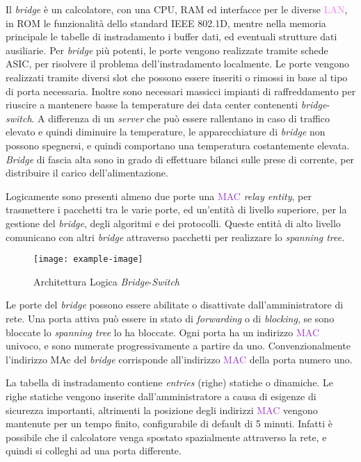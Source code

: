 \documentclass{article}
\numberwithin{equation}{subsection}
\begin{document}
Il \textit{bridge} è un calcolatore, con una CPU, RAM ed interfacce per le diverse \textcolor{violet}{LAN}, in ROM le funzionalità dello standard IEEE 802.1D, mentre nella memoria principale le tabelle di instradamento i buffer dati, ed eventuali strutture dati ausiliarie. 
Per \textit{bridge} più potenti, le  porte vengono realizzate tramite schede ASIC, per risolvere il problema dell'instradamento localmente. Le porte vengono realizzati tramite 
diversi slot che possono essere inseriti o rimossi in base al tipo di porta necessaria. Inoltre sono necessari massicci impianti di raffreddamento per riuscire a 
mantenere basse la temperature dei data center contenenti \textit{bridge}-\textit{switch}. A differenza di un \textit{server} che può essere rallentano in caso di traffico elevato e quindi diminuire la temperature, le apparecchiature di \textit{bridge} non possono 
spegnersi, e quindi comportano una temperatura costantemente elevata. \textit{Bridge} di fascia alta sono in grado di effettuare bilanci sulle prese di corrente, per distribuire il carico dell'alimentazione. 

Logicamente sono presenti almeno due porte una \textcolor{DarkOrchid}{MAC} \textit{relay entity}, per trasmettere i pacchetti tra le varie porte, ed un'entità di livello superiore, per la gestione 
del \textit{bridge}, degli algoritmi e dei protocolli. Queste entità di alto livello comunicano con altri \textit{bridge} attraverso pacchetti per realizzare lo \textit{spanning tree}. 

\begin{figure}[H]%
    \centering%
    \texttt{[image: example-image]}%
    \caption{Architettura Logica \textit{Bridge}-\textit{Switch}}%
\end{figure}

Le porte del \textit{bridge} possono essere abilitate o disattivate dall'amministratore di rete. Una porta attiva può essere in stato di \textit{forwarding} o di \textit{blocking}, se sono 
bloccate lo \textit{spanning tree} lo ha bloccate. Ogni porta ha un indirizzo \textcolor{DarkOrchid}{MAC} univoco, e sono numerate progressivamente a partire da uno. Convenzionalmente l'indirizzo MAc 
del \textit{bridge} corrisponde all'indirizzo \textcolor{DarkOrchid}{MAC} della porta numero uno. 

La tabella di instradamento contiene \textit{entries} (righe) statiche o dinamiche. Le righe statiche vengono inserite dall'amministratore a causa di esigenze di sicurezza 
importanti, altrimenti la posizione degli indirizzi \textcolor{DarkOrchid}{MAC} vengono mantenute per un tempo finito, configurabile di default di 5 minuti. Infatti è possibile che il calcolatore 
venga spostato spazialmente attraverso la rete, e quindi si colleghi ad una porta differente. 
\end{document}
